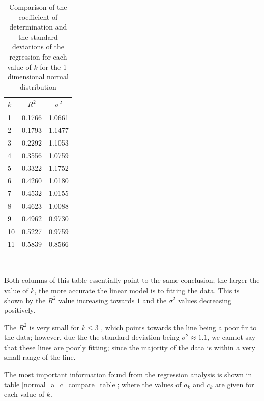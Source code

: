 \documentclass{report}
\begin{document}
\begin{table}
\caption{Comparison of the coefficient of determination and the standard deviations of the regression for each value of $k$ for the 1-dimensional normal distribution} \label{normal_rsq}
\begin{center}
\begin{tabular}{| l | c c |} 
\toprule
$k$ & $R^2$ & $\sigma^2$ \\
\midrule[1pt]
1     & 0.1766    & 1.0661    \\
2     & 0.1793    & 1.1477    \\
3     & 0.2292    & 1.1053    \\
4     & 0.3556    & 1.0759    \\
5     & 0.3322    & 1.1752   \\
6     & 0.4260    & 1.0180   \\
7     & 0.4532    & 1.0155   \\
8     & 0.4623    & 1.0088   \\
9     & 0.4962    & 0.9730   \\
10    & 0.5227    & 0.9759   \\
11    & 0.5839    & 0.8566  \\
\hline
\end{tabular}
\\[10pt]
\end{center}
\end{table}

Both columns of this table essentially point to the same conclusion; the larger the value of $k$, the more accurate the linear model is to fitting the data. This is shown by the $R^2$ value increasing towards $1$ and the $\sigma^2$ values decreasing positively. 

The $R^2$ is very small for $k \leq 3$ , which points towards the line being a poor fir to the data; however, due the the standard deviation being $\sigma^2 \approx 1.1$, we cannot say that these lines are poorly fitting; since the majority of the data is within a very small range of the line.

The most important information found from the regression analysis is shown in table \ref{normal_a_c_compare_table}; where the values of $a_{k}$ and $c_{k}$ are given for each value of $k$.
\end{document}
